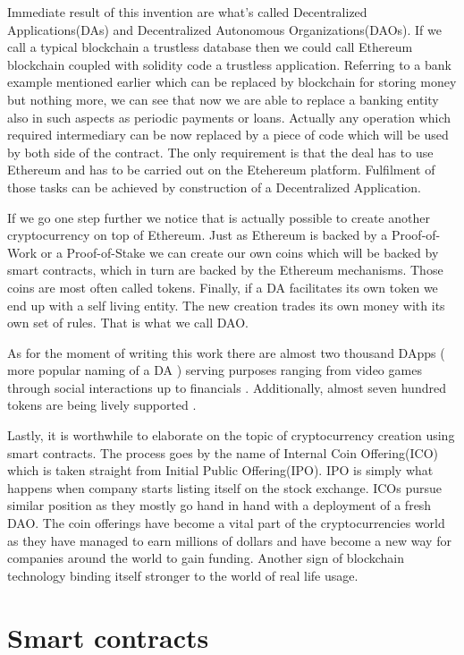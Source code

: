 \documentclass[a4paper,12pt,twoside,openany]{report}
\begin{document}
Immediate result of this invention are what's called Decentralized Applications(DAs) and Decentralized Autonomous Organizations(DAOs). If we call a typical blockchain a trustless database then we could call Ethereum blockchain coupled with solidity code a trustless application. Referring to a bank example mentioned earlier which can be replaced by blockchain for storing money but nothing more, we can see that now we are able to replace a banking entity also in such aspects as periodic payments or loans. Actually any operation which required intermediary can be now replaced by a piece of code which will be used by both side of the contract. The only requirement is that the deal has to use Ethereum and has to be carried out on the Etehereum platform. Fulfilment of those tasks can be achieved by construction of a Decentralized Application. 

If we go one step further we notice that is actually possible to create another cryptocurrency on top of Ethereum. Just as Ethereum is backed by a Proof-of-Work or a Proof-of-Stake we can create our own coins which will be backed by smart contracts, which in turn are backed by the Ethereum mechanisms. Those coins are most often called tokens. Finally, if a DA facilitates its own token we end up with a self living entity. The new creation trades its own money with its own set of rules. That is what we call DAO.

As for the moment of writing this work there are almost two thousand DApps ( more popular naming of a DA ) serving purposes ranging from video games through social interactions up to financials \cite{dapps}.  Additionally, almost seven hundred tokens are being lively supported \cite{tokens}. 

Lastly, it is worthwhile to elaborate on the topic of cryptocurrency creation using smart contracts. The process goes by the name of Internal Coin Offering(ICO) which is taken straight from Initial Public Offering(IPO). IPO is simply what happens when company starts listing itself on the stock exchange. ICOs  pursue similar position as they mostly go hand in hand with a deployment of a fresh DAO. The coin offerings have become a vital part of the cryptocurrencies world as they have managed to earn millions of dollars and have become a new way for companies around the world to gain funding. Another sign of blockchain technology binding itself stronger to the world of real life usage.

\section{Smart contracts}
\end{document}
